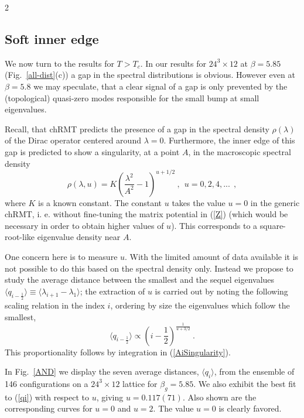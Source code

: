 \begin{multicols}{2}
\subsection{Soft inner edge}

We now turn to the results for $T>T_c$. In our results for  $24^3\times 12$ at
$\beta=5.85$ (Fig.~\ref{all-dist}(c))  a gap in the spectral distributions  is
obvious. However even at $\beta=5.8$ we may speculate, that a clear signal of a
gap is only prevented by the (topological) quasi-zero modes responsible for the
small bump at small eigenvalues.

Recall, that chRMT\space \cite{JaVe96} predicts the presence of a gap in the
spectral density $\rho(\lambda)$ of the Dirac operator centered around
$\lambda=0$. Furthermore, the inner edge of this gap is predicted to  show a
singularity, at a point $A$, in the macroscopic spectral density \cite{KaFr98}
\begin{equation}
\rho(\lambda,u)=K\left(\frac{\lambda^2}{A^2}-1\right)^{u+1/2} \ ,
\ \ u=0,2,4,...  \  \ ,  
\label{AiSingularity}
\end{equation}
where $K$ is a known constant. The constant $u$ takes the value $u=0$ in the
generic chRMT, i. e. without fine-tuning the matrix potential in (\ref{Z})
(which would be necessary in order to  obtain higher values of $u$). This
corresponds to a square-root-like eigenvalue density near $A$.

One concern here is to measure $u$. With the limited amount of data available
it is not possible to do this based on the spectral density only. Instead we
propose to study the average distance between the smallest and the sequel
eigenvalues $\langle q_{i-\frac{1}{2}}\rangle
\equiv\langle\lambda_{i+1}-\lambda_1\rangle$; the extraction of $u$ is carried
out by noting the following scaling relation  in the index $i$, ordering by
size the eigenvalues which follow the smallest,
\begin{equation}
\langle q_{i-\frac{1}{2}}\rangle\propto \left(i-\frac{1}{2}\right)^\frac{1}{u+3/2} \ .
\label{qi}
\end{equation}
This proportionality follows by integration in (\ref{AiSingularity}). 

In Fig.~\ref{AND} we display the seven average distances,  $\langle
q_i\rangle$, from the  ensemble of 146 configurations on a $24^3\times12$
lattice for $\beta_g=5.85$. We also exhibit the best fit to (\ref{qi}) with
respect to $u$, giving $u=0.117(71)$. Also shown are the corresponding curves
for $u=0$ and $u=2$. The value $u=0$ is clearly favored.


\end{multicols}
